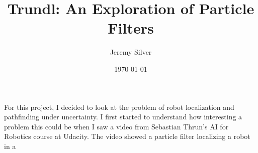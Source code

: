 \message{ !name(report.tex)}\documentclass[letterpaper]{article}
\title{Trundl: An Exploration of Particle Filters}
\author{Jeremy Silver}
\date{\today}
\begin{document}

\label{sec:overview}

For this project, I decided to look at the problem of robot localization and pathfinding under uncertainty. I first started to understand how interesting a problem this could be when I saw a video from Sebastian Thrun's AI for Robotics course at Udacity. The video showed a particle filter localizing a robot in a 



\end{document}
